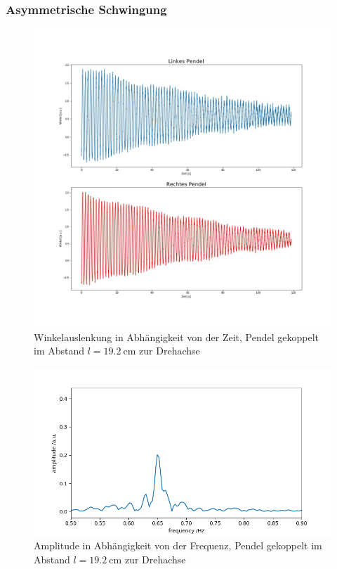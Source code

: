 \subsubsection{Asymmetrische Schwingung}
\begin{figure}[H]
	\centering
	\includegraphics[height = 0.5 \textheight]{figures/211-11.jpeg}
	\caption{Winkelauslenkung in Abhängigkeit von der Zeit, Pendel gekoppelt im Abstand $l = \SI{19,2}{\cm}$ zur Drehachse}
\end{figure}
\begin{figure}[H]
	\centering
	\includegraphics[height = 0.23 \textheight]{figures/211-12.jpeg}
	\caption{Amplitude in Abhängigkeit von der Frequenz, Pendel gekoppelt im Abstand $l = \SI{19,2}{\cm}$ zur Drehachse}
\end{figure}

